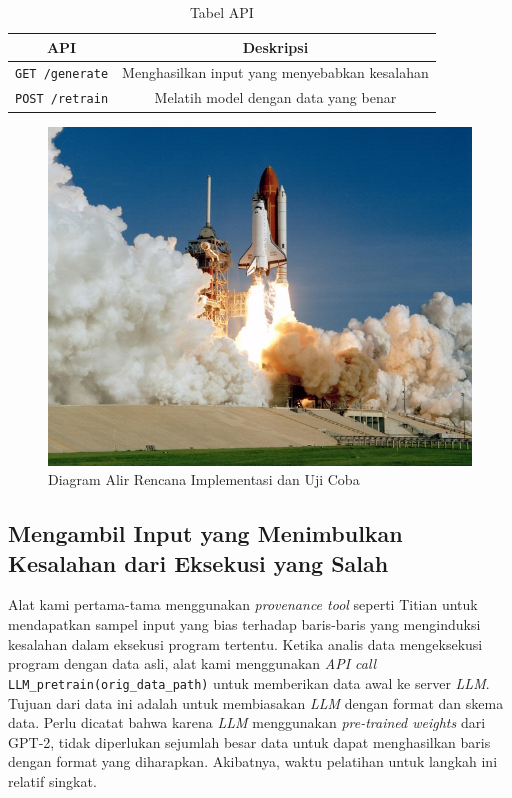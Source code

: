 \begin{table}[H]
  \centering
  \caption{Tabel API}
  \begin{tabular}{|c|c|}
    \hline
    \textbf{API} & \textbf{Deskripsi} \\
    \hline
    \texttt{GET /generate} & Menghasilkan input yang menyebabkan kesalahan \\
    \hline
    \texttt{POST /retrain} & Melatih model dengan data yang benar \\
    \hline
  \end{tabular}
  \label{tab:api}
\end{table}

\begin{figure}[H]
  \centering
  \includegraphics[scale=0.35]{gambar/roketluarangkasa.jpg}

  \caption{Diagram Alir Rencana Implementasi dan Uji Coba}
  \label{fig:diagram alir implementasi}
\end{figure}

\subsection{Mengambil Input yang Menimbulkan Kesalahan dari Eksekusi yang Salah}
\label{sec:mengambil input}

Alat kami pertama-tama menggunakan \emph{provenance tool} 
seperti Titian untuk mendapatkan sampel input yang bias 
terhadap baris-baris yang menginduksi kesalahan dalam eksekusi 
program tertentu. Ketika analis data mengeksekusi program 
dengan data asli, alat kami menggunakan \emph{API call} 
{\tt LLM\_pretrain(orig\_data\_path)} untuk memberikan data 
awal ke server \emph{LLM}. Tujuan dari data ini adalah untuk 
membiasakan \emph{LLM} dengan format dan skema data. 
Perlu dicatat bahwa karena \emph{LLM} menggunakan 
\emph{pre-trained weights} dari GPT-2, tidak diperlukan 
sejumlah besar data untuk dapat menghasilkan baris dengan 
format yang diharapkan. Akibatnya, waktu pelatihan untuk 
langkah ini relatif singkat.

